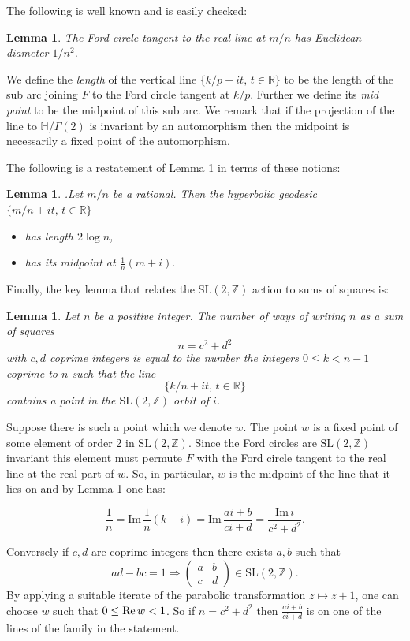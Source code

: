 \documentclass[12pt,a4paper]{amsart}
\newtheorem{lem}[thm]{Lemma}
\def\HH{\mathbb{H}}
\def\im{\mathrm{Im}\,}
\def\xx{\HH/g2}
\def\ZZ{\mathbb{Z}}
\def\RR{\mathbb{R}}
\def\sl2{\mathrm{SL}(2, \ZZ)}
\def\g2{\Gamma(2)}
\def\xx{\HH/\g2}
\begin{document}
The following is well known and is easily checked:

\begin{lem}\label{ford}
The Ford circle tangent to the real line at $m/n$
has Euclidean diameter $1/n^2$.
\end{lem}


We define the \textit{length} of the vertical line 
$\{ k/p + i t,\, t \in \RR \}$
to be the length of the  sub arc joining 
$F$ to the Ford circle tangent at $k/p$.
Further we define its  \textit{mid point} to be the midpoint of this sub arc.
We remark that if the projection of the line to $\xx$
is invariant by an automorphism 
then the midpoint is necessarily a fixed point of the automorphism.

The following is a restatement of Lemma \ref{ford} in terms of these notions:

\begin{lem}.\label{calcul}
Let $m/n$ be a rational. 
Then the hyperbolic  geodesic $\{ m/n + i t,\, t \in \RR \}$
\begin{itemize}
\item has  length $2\log n$,
\item has its midpoint at $ \frac{1 }{n}(m + i).$
\end{itemize}
\end{lem}

Finally, the key lemma that relates the $\sl2$ action to sums of squares is:

\begin{lem} \label{squares}
Let $n$ be a positive integer.
The number of  ways of writing $n$  as a  sum of squares
$$n = c^2 + d^2$$
with $c,d$ coprime integers
is equal to the number the  integers $0 \leq k < n-1$ coprime to $n$
such that the line
$$\{  k/n + i t,\, t \in \RR \}$$
contains  a point in the $\sl2$  orbit of $i$.
\end{lem}


\proof  Suppose there is such  a point which we denote  $w$.
The point $w$ is a fixed point of some  element of order 2 in $\sl2$.
Since the Ford circles are $\sl2$ invariant
this element must permute $F$ with the Ford circle tangent 
to the real line  at the real part of $w$.
So, in particular, $w$ is the midpoint of the line 
that it lies on 
and by  Lemma \ref{calcul} one has:

$$\frac{1}{n} = \im \frac{1 }{n}(k + i)  
= \im  \frac{ai +b}{ci+d }
= \frac{\im i} {c^2 + d^2}.$$

Conversely if $c,d$ are coprime integers 
 then there exists $a,b$ such that
 $$ad - bc = 1 \Rightarrow  
 \begin{pmatrix}
 a & b \\
 c & d
 \end{pmatrix} \in \sl2.
$$
By applying a suitable iterate of the parabolic transformation 
$z \mapsto z + 1$,
one can choose $w$ such that $0 \leq \text{Re\,} w < 1$.
So if $n = c^2 + d^2$ then $\frac{ai +b}{ci+d }$
is on one of the lines of the family in the statement.
\end{document}
